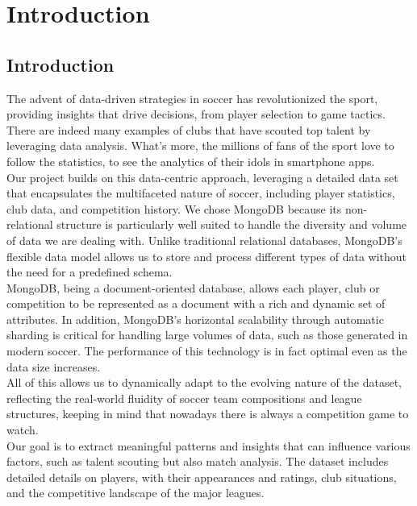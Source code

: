 \documentclass{Configuration_Files/PoliMi3i_thesis}
\begin{document}
\mainmatter %

\chapter{Introduction}
\label{ch:chapter_one}%

\section{Introduction}
\label{sec:section_Introduction}
The advent of data-driven strategies in soccer has revolutionized the sport, providing insights that drive decisions, from player selection to game tactics. There are indeed many examples of clubs that have scouted top talent by leveraging data analysis. What's more, the millions of fans of the sport love to follow the statistics, to see the analytics of their idols in smartphone apps.\\
Our project builds on this data-centric approach, leveraging a detailed data set that encapsulates the multifaceted nature of soccer, including player statistics, club data, and competition history. We chose MongoDB because its non-relational structure is particularly well suited to handle the diversity and volume of data we are dealing with. Unlike traditional relational databases, MongoDB's flexible data model allows us to store and process different types of data without the need for a predefined schema.\\
MongoDB, being a document-oriented database, allows each player, club or competition to be represented as a document with a rich and dynamic set of attributes. In addition, MongoDB's horizontal scalability through automatic sharding is critical for handling large volumes of data, such as those generated in modern soccer. The performance of this technology is in fact optimal even as the data size increases. \\
All of this allows us to dynamically adapt to the evolving nature of the dataset, reflecting the real-world fluidity of soccer team compositions and league structures, keeping in mind that nowadays there is always a competition game to watch.\\
Our goal is to extract meaningful patterns and insights that can influence various factors, such as talent scouting but also match analysis. The dataset includes detailed details on players, with their appearances and ratings, club situations, and the competitive landscape of the major leagues.
\end{document}
